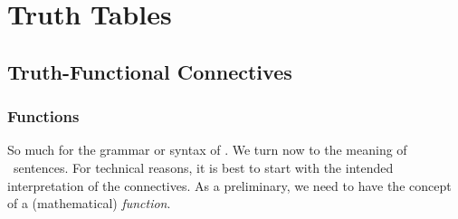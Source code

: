 \part{Truth Tables}
\label{ch.TruthTables}



\chapter{Truth-Functional Connectives}\label{s:TruthFunctionality}

\section{Functions}\label{ss.function}

So much for the grammar or syntax of \TFL. We turn now to the meaning of \TFL\ sentences. For technical reasons, it is best to  start with the intended interpretation of the connectives. As a preliminary, we need to have the concept of a (mathematical) \emph{function}. 

